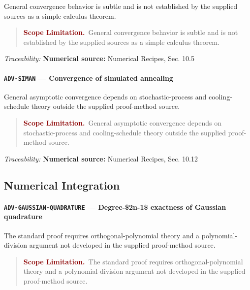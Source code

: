 \documentclass[10pt]{article}
\newcommand{\pidraw}[1]{\begingroup\urlstyle{tt}\nolinkurl{#1}\endgroup}
\theoremstyle{definition}
\theoremstyle{remark}
\newenvironment{scopelimitation}
{\begin{quote}\small\noindent\textbf{\textcolor{darkred}{Scope Limitation.}}\ }
{\end{quote}}
\begin{document}
General convergence behavior is subtle and is not established by the supplied sources as a simple calculus theorem.

\begin{scopelimitation}General convergence behavior is subtle and is not established by the supplied sources as a simple calculus theorem.\end{scopelimitation}

\smallskip\noindent\textit{Traceability:} \textbf{Numerical source:} Numerical Recipes, Sec. 10.5\par

\label{prf:ADV-SIMAN}

\paragraph{\pidraw{ADV-SIMAN} --- Convergence of simulated annealing}

General asymptotic convergence depends on stochastic-process and cooling-schedule theory outside the supplied proof-method source.

\begin{scopelimitation}General asymptotic convergence depends on stochastic-process and cooling-schedule theory outside the supplied proof-method source.\end{scopelimitation}

\smallskip\noindent\textit{Traceability:} \textbf{Numerical source:} Numerical Recipes, Sec. 10.12\par

\subsection{Numerical Integration}

\label{prf:ADV-GAUSSIAN-QUADRATURE}

\paragraph{\pidraw{ADV-GAUSSIAN-QUADRATURE} --- Degree-\$2n-1\$ exactness of Gaussian quadrature}

The standard proof requires orthogonal-polynomial theory and a polynomial-division argument not developed in the supplied proof-method source.

\begin{scopelimitation}The standard proof requires orthogonal-polynomial theory and a polynomial-division argument not developed in the supplied proof-method source.\end{scopelimitation}
\end{document}
